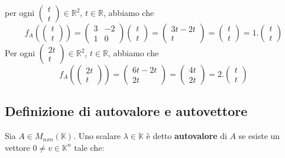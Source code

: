 \documentclass[12pt]{article}
\begin{document}
per ogni $\begin{pmatrix}
    t\\
    t
\end{pmatrix} \in \mathbb{R}^2$, $t \in \mathbb{R}$, abbiamo che
\[f_A\left(\begin{pmatrix}
    t\\
    t
\end{pmatrix}\right) = \begin{pmatrix}
    3 & -2\\
    1 & 0
\end{pmatrix}\begin{pmatrix}
    t\\
    t
\end{pmatrix} = \begin{pmatrix}
    3t - 2t\\
    t
\end{pmatrix} = \begin{pmatrix}
    t\\
    t
\end{pmatrix} = 1.\begin{pmatrix}
    t\\
    t
\end{pmatrix}\]
Per ogni $\begin{pmatrix}
    2t\\
    t
\end{pmatrix} \in \mathbb{R}^2$, $t \in \mathbb{R}$, abbiamo che
\[f_A\left(\begin{pmatrix}
    2t\\
    t
\end{pmatrix}\right) = \begin{pmatrix}
    6t - 2t\\
    2t
\end{pmatrix} = \begin{pmatrix}
    4t\\
    2t
\end{pmatrix} = 2.\begin{pmatrix}
    t\\
    t
\end{pmatrix}\]

\subsection{Definizione di autovalore e autovettore}

Sia $A \in M_{nxn} (\mathbb{K})$. Uno scalare $\lambda \in \mathbb{K}$ è detto \textbf{autovalore} di $A$ se esiste un vettore $0 \neq v \in \mathbb{K}^n$ tale che:
\end{document}

